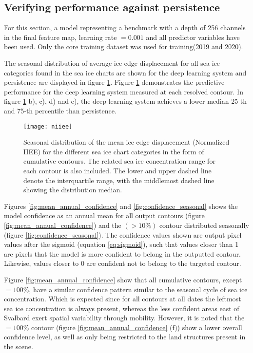 \documentclass[../main/thesis.tex]{subfiles}
\begin{document}
\subsection{Verifying performance against persistence}
\label{sec:performance-persistence}
For this section, a model representing a benchmark with a depth of 256 channels in the final feature map, learning rate $=0.001$ and all predictor variables have been used. Only the core training dataset was used for training(2019 and 2020).

The seasonal distribution of average ice edge displacement for all sea ice categories found in the sea ice charts are shown for the deep learning system and persistence are displayed in figure \ref{fig:violins}. Figure \ref{fig:violins} demonstrates the predictive performance for the deep learning system measured at each resolved contour. In figure \ref{fig:violins} b), c), d) and e), the deep learning system achieves a lower median 25-th and 75-th percentile than persistence.

\begin{figure}
    \centering
    \texttt{[image: niiee]}
    \caption{\label{fig:violins}Seasonal distribution of the mean ice edge displacement (Normalized IIEE) for the different sea ice chart categories in the form of cumulative contours. The related sea ice concentration range for each contour is also included. The lower and upper dashed line denote the interquartile range, with the middlemost dashed line showing the distribution median.}
\end{figure}

Figures \ref{fig:mean_annual_confidence} and \ref{fig:confidence_seasonal} shows the model confidence as an annual mean for all output contours (figure \ref{fig:mean_annual_confidence}) and the $(> 10\%)$ contour distributed seasonally (figure \ref{fig:confidence_seasonal}). The confidence values shown are output pixel values after the sigmoid (equation \ref{eq:sigmoid}), such that values closer than 1 are pixels that the model is more confident to belong in the outputted contour. Likewise, values closer to 0 are confident not to belong to the targeted contour.

Figure \ref{fig:mean_annual_confidence} show that all cumulative contours, except $=100\%$, have a similar confidence pattern similar to the seasonal cycle of sea ice concentration. Which is expected since for all contours at all dates the leftmost sea ice concentration is always present, whereas the less confident areas east of Svalbard exert spatial variability through mobility. However, it is noted that the $=100\%$ contour (figure \ref{fig:mean_annual_confidence} (f)) show a lower overall confidence level, as well as only being restricted to the land structures present in the scene.
\end{document}
